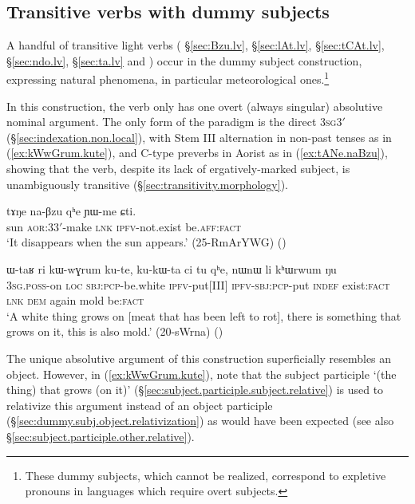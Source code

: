 \subsection{Transitive verbs with dummy subjects} \label{sec:transitive.dummy}
A handful of transitive light verbs ( §\ref{sec:Bzu.lv},  §\ref{sec:lAt.lv},  §\ref{sec:tCAt.lv},  §\ref{sec:ndo.lv},  §\ref{sec:ta.lv} and ) occur in the dummy subject construction, expressing natural phenomena, in particular meteorological ones.\footnote{These dummy subjects, which cannot be realized, correspond to expletive pronouns in languages which require overt subjects. }
  
In this construction, the verb only has one overt (always singular) absolutive nominal argument. The only form of the paradigm is the direct \textsc{3sg}\fl{}3$'$ (§\ref{sec:indexation.non.local}), with Stem III alternation in non-past tenses as in (\ref{ex:kWwGrum.kute}), and C-type preverbs in Aorist as in (\ref{ex:tANe.naBzu}), showing that the verb, despite its lack of ergatively-marked subject, is unambiguously transitive (§\ref{sec:transitivity.morphology}). 
 
 
\begin{exe}
\ex \label{ex:tANe.naBzu}
\gll tɤŋe na-βzu qʰe ɲɯ-me ɕti. \\
sun \textsc{aor}:3\fl{}3$'$-make \textsc{lnk} \textsc{ipfv}-not.exist be.\textsc{aff}:\textsc{fact} \\
\glt `It disappears when the sun appears.' (25-RmArYWG)
()
\end{exe}

\begin{exe}
\ex \label{ex:kWwGrum.kute}
\gll  ɯ-taʁ ri kɯ-wɣrum ku-te, ku-kɯ-ta ci tu qʰe, nɯnɯ li kʰɯrwum ŋu \\ 
\textsc{3sg}.\textsc{poss}-on \textsc{loc} \textsc{sbj}:\textsc{pcp}-be.white \textsc{ipfv}-put[III] \textsc{ipfv}-\textsc{sbj}:\textsc{pcp}-put \textsc{indef} exist:\textsc{fact} \textsc{lnk} \textsc{dem} again mold be:\textsc{fact} \\
\glt `A white thing grows on [meat that has been left to rot], there is something that grows on it, this is also mold.' (20-sWrna)
()
\end{exe}

The unique absolutive argument of this construction superficially resembles an object. However, in (\ref{ex:kWwGrum.kute}), note that the subject participle  `(the thing) that grows (on it)' (§\ref{sec:subject.participle.subject.relative}) is used to relativize this argument instead of an object participle (§\ref{sec:dummy.subj.object.relativization}) as would have been expected (see also §\ref{sec:subject.participle.other.relative}).

